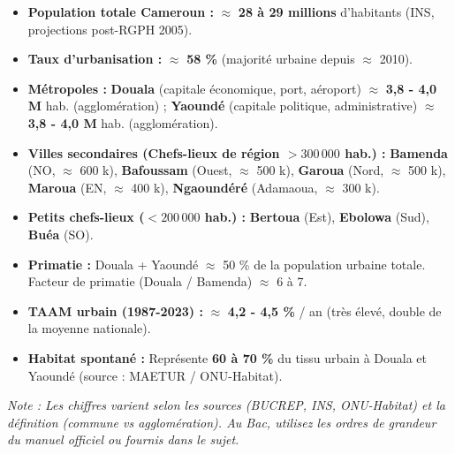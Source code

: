 \documentclass[11pt]{article}
\begin{document}
\begin{savaistu}
\begin{itemize}
    \item \textbf{Population totale Cameroun :} $\approx$ \textbf{28 à 29 millions} d'habitants (INS, projections post-RGPH 2005).
    \item \textbf{Taux d'urbanisation :} $\approx$ \textbf{58 \%} (majorité urbaine depuis $\approx$ 2010).
    \item \textbf{Métropoles :} \textbf{Douala} (capitale économique, port, aéroport) $\approx$ \textbf{3,8 - 4,0 M} hab. (agglomération) ; \textbf{Yaoundé} (capitale politique, administrative) $\approx$ \textbf{3,8 - 4,0 M} hab. (agglomération).
    \item \textbf{Villes secondaires (Chefs-lieux de région $> 300\,000$ hab.) :} \textbf{Bamenda} (NO, $\approx$ 600 k), \textbf{Bafoussam} (Ouest, $\approx$ 500 k), \textbf{Garoua} (Nord, $\approx$ 500 k), \textbf{Maroua} (EN, $\approx$ 400 k), \textbf{Ngaoundéré} (Adamaoua, $\approx$ 300 k).
    \item \textbf{Petits chefs-lieux ($< 200\,000$ hab.) :} \textbf{Bertoua} (Est), \textbf{Ebolowa} (Sud), \textbf{Buéa} (SO).
    \item \textbf{Primatie :} Douala + Yaoundé $\approx$ 50 \% de la population urbaine totale. Facteur de primatie (Douala / Bamenda) $\approx$ 6 à 7.
    \item \textbf{TAAM urbain (1987-2023) :} $\approx$ \textbf{4,2 - 4,5 \%} / an (très élevé, double de la moyenne nationale).
    \item \textbf{Habitat spontané :} Représente \textbf{60 à 70 \%} du tissu urbain à Douala et Yaoundé (source : MAETUR / ONU-Habitat).
\end{itemize}
\emph{Note : Les chiffres varient selon les sources (BUCREP, INS, ONU-Habitat) et la définition (commune vs agglomération). Au Bac, utilisez les ordres de grandeur du manuel officiel ou fournis dans le sujet.}
\end{savaistu}
\end{document}
